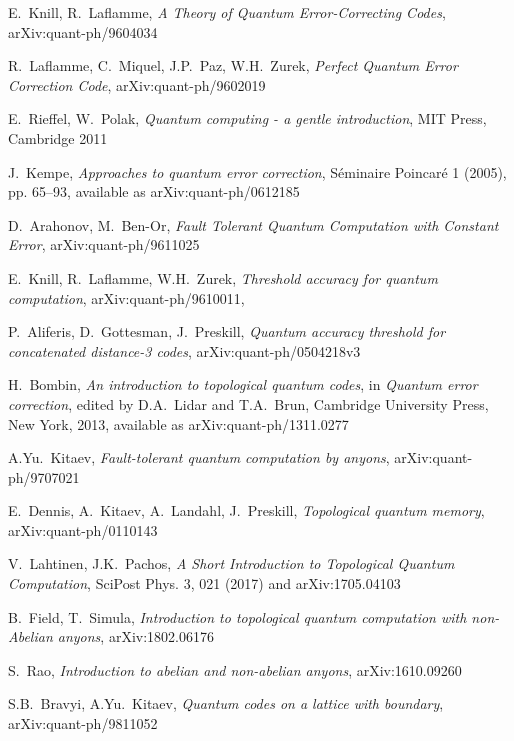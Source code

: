 \documentclass[a4paper, draft]{article}
\theoremstyle{own}
\theoremstyle{remark}
\begin{document}
\begin{thebibliography}{9}
E.~Knill, R.~Laflamme, \emph{A Theory of Quantum Error-Correcting Codes}, arXiv:quant-ph/9604034

R.~Laflamme, C.~Miquel, J.P.~Paz, W.H.~Zurek, \emph{Perfect Quantum Error Correction Code}, 	arXiv:quant-ph/9602019	
	

E.~Rieffel, W.~Polak, \emph{Quantum computing - a gentle introduction},
MIT Press, Cambridge 2011

J.~Kempe, \emph{Approaches to quantum error correction}, S\'eminaire Poincar\'e 1 (2005), pp. 65--93, available as arXiv:quant-ph/0612185

D.~Arahonov, M.~Ben-Or, \emph{Fault Tolerant Quantum Computation with Constant Error},
arXiv:quant-ph/9611025

E.~Knill, R.~Laflamme, W.H.~Zurek, \emph{Threshold accuracy for quantum computation}, arXiv:quant-ph/9610011,

P.~Aliferis, D.~Gottesman, J.~Preskill, \emph{Quantum accuracy threshold for concatenated distance-3 codes}, arXiv:quant-ph/0504218v3

H.~Bombin, 
\emph{An introduction to topological quantum codes}, in \emph{Quantum error correction}, edited by D.A.~Lidar and T.A.~Brun, Cambridge University Press, New York, 2013, available as arXiv:quant-ph/1311.0277 

A.Yu.~Kitaev, \emph{Fault-tolerant quantum computation by anyons}, 
arXiv:quant-ph/9707021

E.~Dennis, A.~Kitaev, A.~Landahl, J.~Preskill,
\emph{Topological quantum memory}, arXiv:quant-ph/0110143

V.~Lahtinen, J.K.~Pachos,
\emph{A Short Introduction to Topological Quantum Computation}, SciPost Phys. 3, 021 (2017) and arXiv:1705.04103

B.~Field, T.~Simula,
\emph{Introduction to topological quantum computation with non-Abelian anyons},
arXiv:1802.06176

S.~Rao, \emph{Introduction to abelian and non-abelian anyons}, 	arXiv:1610.09260 

S.B.~Bravyi, A.Yu.~Kitaev, 
\emph{Quantum codes on a lattice with boundary}, arXiv:quant-ph/9811052



\end{thebibliography}
\end{document}
